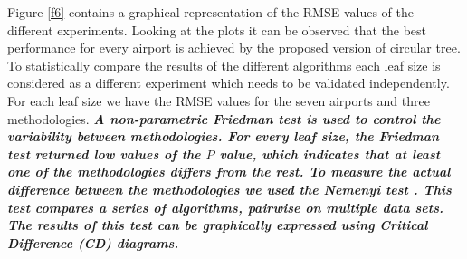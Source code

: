 \documentclass[times,twocolumn,final,authoryear]{elsarticle}
\begin{document}
Figure \ref{f6} contains a graphical representation of the RMSE values of the different experiments. Looking at the plots it can be observed that the best performance for every airport is achieved by the proposed version of circular tree. To statistically compare the results of the different algorithms each leaf size is considered as a different experiment which needs to be validated independently. For each leaf size we have the RMSE values for the seven airports and three methodologies. \textbf{\textit{A non-parametric Friedman test is used to control the variability between methodologies. For every leaf size, the Friedman test returned low values of the $P$ value, which indicates that at least one of the methodologies differs from the rest. To measure the actual difference between the methodologies we used the Nemenyi test \citep{Demsar2006}. This test compares a series of algorithms, pairwise on multiple data sets. The results of this test can be graphically expressed using Critical Difference (CD) diagrams.}}
\end{document}
